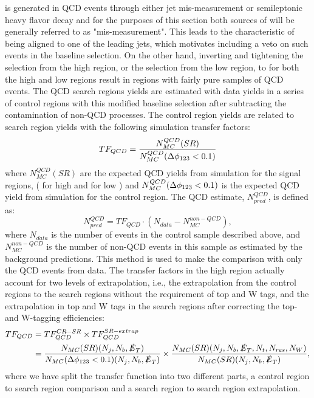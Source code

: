 \met{} is generated in QCD events through either jet \pt{} mis-measurement or semileptonic heavy flavor decay and for the purposes of this section both sources of \met{} will be generally referred to as "mis-measurement". This leads to the characteristic of \met{} being aligned to one of the leading jets, which motivates including a veto on such events in the baseline selection. On the other hand, inverting and tightening the \highdm{} selection from the high \dm{} region, or the \lowdm{} selection from the low \dm{} region, to \qcdcr{} for both the high and low \dm{} regions result in regions with fairly pure samples of QCD events. The QCD search regions yields are estimated with data yields in a series of control regions with this modified baseline selection after subtracting the contamination of non-QCD processes. The control region yields are related to search region yields with the following simulation transfer factors:
\begin{equation}\label{QCDTF}
TF_{QCD}=\frac{N_{MC}^{QCD}(SR)}{N_{MC}^{QCD}(\Delta\phi_{123}<0.1)}
\end{equation}
where $N_{MC}^{QCD}(SR)$ are the expected QCD yields from simulation for the signal regions, (\highdm{} for high \dm{} and \lowdm{} for low \dm) and $N_{MC}^{QCD}(\Delta\phi_{123}<0.1)$ is the expected QCD yield from simulation for the control region. The QCD estimate, $N_{pred}^{QCD}$, is defined as:
\begin{equation}
N_{pred}^{QCD}=TF_{QCD}\cdot(N_{data}-N_{MC}^{non-QCD}),
\end{equation}
where $N_{data}$ is the number of events in the \qcdcr{} control sample described above, and $N_{MC}^{non-QCD}$ is the number of non-QCD events in this sample as estimated by the background predictions. This method is used to make the comparison with only the QCD events from data. The transfer factors in the high \dm{} region actually account for two levels of extrapolation, i.e., the extrapolation from the control regions to the search regions without the requirement of top and W tags, and the extrapolation in top and W tags in the search regions after correcting the top- and W-tagging efficiencies:
\begin{equation}\label{QCDTFExtrapolation}
\begin{split}
TF_{QCD}&=TF_{QCD}^{CR-SR}\times TF_{QCD}^{SR-extrap} \\
&=\frac{N_{MC}(SR)(N_{j},N_{b},\slashed{E}_{T})}{N_{MC}(\Delta\phi_{123}<0.1)(N_{j},N_{b},\slashed{E}_{T})}\times\frac{N_{MC}(SR)(N_{j},N_{b},\slashed{E}_{T},N_{t},N_{res},N_{W})}{N_{MC}(SR)(N_{j},N_{b},\slashed{E}_{T})},
\end{split}
\end{equation}
where we have split the transfer function into two different parts, a control region to search region comparison and a search region to search region extrapolation.

